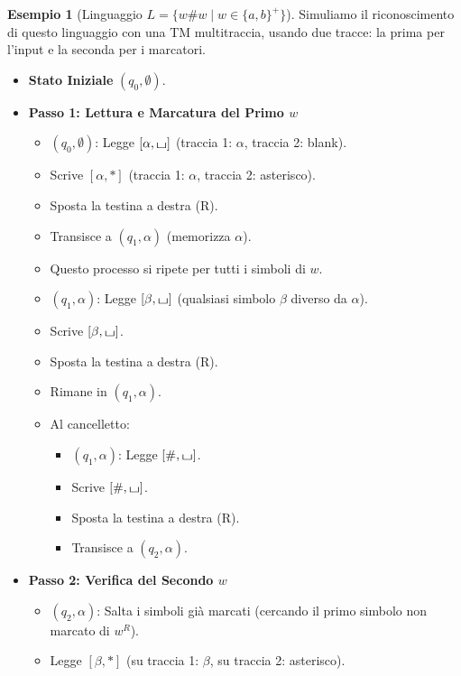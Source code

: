 \documentclass[a4paper]{article}
\theoremstyle{definition} %
\newtheorem{example}{Esempio}
\newcommand{\blankS}{\ensuremath{\raisebox{-0.15ex}{\scalebox{1.3}[0.7]{$\sqcup$}}}}
\begin{document}
\begin{example}[Linguaggio $L = \{w\#w \mid w \in \{a,b\}^+\}$]
Simuliamo il riconoscimento di questo linguaggio con una TM multitraccia, usando due tracce: la prima per l'input e la seconda per i marcatori.
\begin{itemize}
    \item \textbf{Stato Iniziale} $(q_0, \emptyset)$.
    \item \textbf{Passo 1: Lettura e Marcatura del Primo $w$}
        \begin{itemize}
            \item $(q_0, \emptyset)$: Legge $[\alpha, \blankS]$ (traccia 1: $\alpha$, traccia 2: blank).
            \item Scrive $[\alpha, *]$ (traccia 1: $\alpha$, traccia 2: asterisco).
            \item Sposta la testina a destra (R).
            \item Transisce a $(q_1, \alpha)$ (memorizza $\alpha$).
            \item Questo processo si ripete per tutti i simboli di $w$.
            \item $(q_1, \alpha)$: Legge $[\beta, \blankS]$ (qualsiasi simbolo $\beta$ diverso da $\alpha$).
            \item Scrive $[\beta, \blankS]$.
            \item Sposta la testina a destra (R).
            \item Rimane in $(q_1, \alpha)$.
            \item Al cancelletto:
                \begin{itemize}
                    \item $(q_1, \alpha)$: Legge $[\#, \blankS]$.
                    \item Scrive $[\#, \blankS]$.
                    \item Sposta la testina a destra (R).
                    \item Transisce a $(q_2, \alpha)$.
                \end{itemize}
        \end{itemize}
    \item \textbf{Passo 2: Verifica del Secondo $w$}
        \begin{itemize}
            \item $(q_2, \alpha)$: Salta i simboli già marcati (cercando il primo simbolo non marcato di $w^R$).
            \item Legge $[\beta, *]$ (su traccia 1: $\beta$, su traccia 2: asterisco).

\end{itemize}
\end{itemize}
\end{example}
\end{document}
